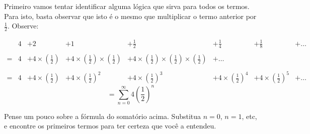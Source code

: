 \documentclass[a4paper]{article}
\begin{document}
Primeiro vamos tentar identificar alguma lógica que sirva para todos
os termos. Para isto, basta observar que isto é o mesmo que
multiplicar o termo anterior por $\frac{1}{2}$. Observe:


\begin{displaymath}
  \begin{array}{rccccccc}
    &4&+2&+1&+\frac{1}{2}&+\frac{1}{4}&+\frac{1}{8}&+\ldots\\
    &&&&&&&\\
    =&4& + 4\times\left(\frac{1}{2}\right)&+4\times\left(\frac{1}{2}\right)\times\left(\frac{1}{2}\right)&+4\times\left(\frac{1}{2}\right)\times\left(\frac{1}{2}\right)\times\left(\frac{1}{2}\right)& + \ldots& & \\
    &&&&&&&\\
    =&4& +4\times\left(\frac{1}{2}\right)&+4\times\left(\frac{1}{2}\right)^2&+4\times\left(\frac{1}{2}\right)^3&+4\times\left(\frac{1}{2}\right)^4&+4\times\left(\frac{1}{2}\right)^5&+\ldots
  \end{array}
\end{displaymath}
\begin{displaymath}
    = \sum_{n=0}^\infty 4\left(\frac{1}{2}\right)^n
\end{displaymath}

Pense um pouco sobre a fórmula do somatório acima. Substitua $n=0$,
$n=1$, etc, e encontre os primeiros termos para ter certeza que você a
entendeu.
\end{document}
